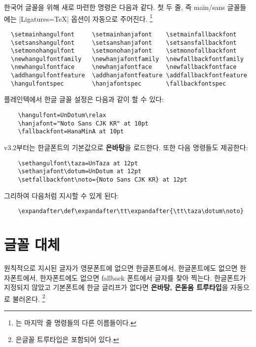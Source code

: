 \documentclass[a4paper]{article}
\def\luatex{\hologo{LuaTeX}}
\def\logoko{\textsf{k}\kern-.0625em\textit{o}}
\def\luatexko{\luatex-\logoko}
\def\texlive{\TeX\ Live}
\def\hemph#1{\textsf{\bfseries #1}}
\newenvironment{plaintex}{%
  \par\bigskip
  \begin{narrower}\small\parindent=0pt
  \leavevmode\llap{\color{gray}plain \TeX\quad}\ignorespaces
}{
  \par
  \end{narrower}%
}
\begin{document}
한국어 글꼴을 위해 새로 마련한 명령은 다음과 같다.%
\pkgkwd*{\setmainhangulfont}%
\pkgkwd*{\setsanshangulfont}%
\pkgkwd*{\setmonohangulfont}%
\pkgkwd*{\newhangulfontfamily}%
\pkgkwd*{\newhangulfontface}%
\pkgkwd*{\addhangulfontfeature}%
\pkgkwd*{\hangulfontspec}
첫 두 줄, 즉 main/sans 글꼴들에는 |Ligatures=TeX| 옵션이 자동으로 주어진다.%
\footnote{%
    는
  마지막 줄 명령들의 다른 이름들이다. }
\begin{verbatim}
  \setmainhangulfont     \setmainhanjafont    \setmainfallbackfont
  \setsanshangulfont     \setsanshanjafont    \setsansfallbackfont
  \setmonohangulfont     \setmonohanjafont    \setmonofallbackfont
  \newhangulfontfamily   \newhanjafontfamily  \newfallbackfontfamily
  \newhangulfontface     \newhanjafontface    \newfallbackfontface
  \addhangulfontfeature  \addhanjafontfeature \addfallbackfontfeature
  \hangulfontspec        \hanjafontspec       \fallbackfontspec
\end{verbatim}

\begin{plaintex}
  플레인텍에서 한글 글꼴 설정은 다음과 같이 할 수 있다:
\begin{verbatim}
    \hangulfont=UnDotum\relax
    \hanjafont="Noto Sans CJK KR" at 10pt
    \fallbackfont=HanaMinA at 10pt
\end{verbatim}

  v3.2부터는 한글폰트의 기본값으로 \hemph{은바탕}을 로드한다.
  또한 다음 명령들도 제공한다:
\begin{verbatim}
    \sethangulfont\taza=UnTaza at 12pt
    \sethanjafont\dotum=UnDotum at 12pt
    \setfallbackfont\noto={Noto Sans CJK KR} at 12pt
\end{verbatim}
  그리하여 다음처럼 지시할 수 있게 된다:
\begin{verbatim}
    \expandafter\def\expandafter\tt\expandafter{\tt\taza\dotum\noto}
\end{verbatim}
\end{plaintex}

\section{글꼴 대체}\label{sec:fontswitch}

원칙적으로  지시된 글자가 영문폰트에 없으면 한글폰트에서,
한글폰트에도 없으면 한자폰트에서, 한자폰트에도 없으면 fallback
폰트에서 글자를 찾아 찍는다.
한글폰트가 지정되지 않았고 기본폰트에 한글 글리프가 없다면
\hemph{은바탕, 은돋움 트루타입}을 자동으로 불러온다.%
\footnote{%
  은글꼴 트루타입은  포함되어 있다. }
\end{document}
